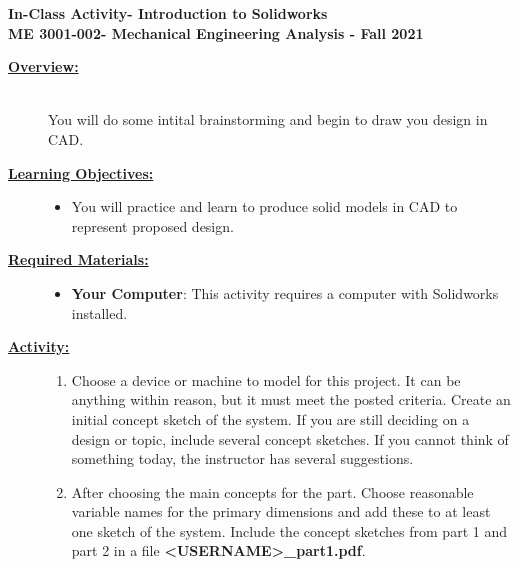 \documentclass[12pt]{article}
\newcommand{\COURNAME}{ME 3001-002}
\newcommand{\CURRTERM}{Fall 2021} %
\newcommand{\ANUM}{2} %
\newcommand{\activitytitle}{Introduction to Solidworks} %
\begin{document}
\thispagestyle{plain}

\begin{center}
   {\bf \Large In-Class Activity\hspc\ANUM\hspc - \activitytitle}\vspace{3mm}\\
   {\bf \large \COURNAME - Mechanical Engineering Analysis - \CURRTERM} \vspace{5mm}\\
\end{center}

\begin{description}

\item[\textbf{\underline{Overview:}}] \hfill \vspace{3mm}\\
You will do some intital brainstorming and begin to draw you design in CAD.

\item[\textbf{\underline{Learning Objectives:}}] \hfill \vspace{0mm}

\begin{itemize}
	\item You will practice and learn to produce solid models in CAD to represent proposed design. 
\end{itemize}

\item[\textbf{\underline{Required Materials:}}] \hfill \vspace{0mm}

\begin{itemize}
	\item {\bf Your Computer}: This activity requires a computer with Solidworks installed.
\end{itemize}

\item[\textbf{\underline{Activity:}}] \hfill \vspace{0mm}

\begin{enumerate}
	

	\item Choose a device or machine to model for this project. It can be anything within reason, but it must meet the posted criteria. Create an initial concept sketch of the system. If you are still deciding on a design or topic, include several concept sketches. If you cannot think of something today, the instructor has several suggestions.
	
	\item After choosing the main concepts for the part. Choose reasonable variable names for the primary dimensions and add these to at least one sketch of the system. Include the concept sketches from part 1 and part 2 in a file {\bf \BL<USERNAME>\BK\_part1.pdf}. 
	

\end{enumerate}
\end{description}
\end{document}
